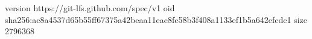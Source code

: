 version https://git-lfs.github.com/spec/v1
oid sha256:ac8a4537d65b55ff67375a42beaa11eac8fc58b3f408a1133ef1b5a642efcdc1
size 2796368
